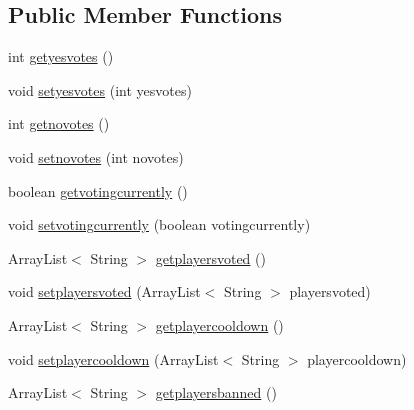 \subsection*{Public Member Functions}
\begin{DoxyCompactItemize}
\item 
int \hyperlink{classcom_1_1thenewprogramming_1_1_bukkit_1_1_vote4_temp_ban_1_1_vote4_temp_ban_aa2fe99fcd8a5bd2bf58662a49bf83fc2}{getyesvotes} ()
\item 
void \hyperlink{classcom_1_1thenewprogramming_1_1_bukkit_1_1_vote4_temp_ban_1_1_vote4_temp_ban_aa6ca06753febe9971e1d5eac46560e5f}{setyesvotes} (int yesvotes)
\item 
int \hyperlink{classcom_1_1thenewprogramming_1_1_bukkit_1_1_vote4_temp_ban_1_1_vote4_temp_ban_ab185c48a259ecf15e94bbfda3c22665e}{getnovotes} ()
\item 
void \hyperlink{classcom_1_1thenewprogramming_1_1_bukkit_1_1_vote4_temp_ban_1_1_vote4_temp_ban_a557bb10dc10906c35c2f3c40ee1343d7}{setnovotes} (int novotes)
\item 
boolean \hyperlink{classcom_1_1thenewprogramming_1_1_bukkit_1_1_vote4_temp_ban_1_1_vote4_temp_ban_a8f782830430b105dd0df19c17b91d0f3}{getvotingcurrently} ()
\item 
void \hyperlink{classcom_1_1thenewprogramming_1_1_bukkit_1_1_vote4_temp_ban_1_1_vote4_temp_ban_a4b8efbbf0fb52177f78c649d38e3be5a}{setvotingcurrently} (boolean votingcurrently)
\item 
Array\-List$<$ String $>$ \hyperlink{classcom_1_1thenewprogramming_1_1_bukkit_1_1_vote4_temp_ban_1_1_vote4_temp_ban_a335936e5cd6e45e17a625bf6c8a4a9a2}{getplayersvoted} ()
\item 
void \hyperlink{classcom_1_1thenewprogramming_1_1_bukkit_1_1_vote4_temp_ban_1_1_vote4_temp_ban_a8c3f2e4375e1eadce28e99d58e36dd58}{setplayersvoted} (Array\-List$<$ String $>$ playersvoted)
\item 
Array\-List$<$ String $>$ \hyperlink{classcom_1_1thenewprogramming_1_1_bukkit_1_1_vote4_temp_ban_1_1_vote4_temp_ban_ae0d37a73a2d093aed8efea23a3a4504d}{getplayercooldown} ()
\item 
void \hyperlink{classcom_1_1thenewprogramming_1_1_bukkit_1_1_vote4_temp_ban_1_1_vote4_temp_ban_a4765c64b4de826181facc3f773293c51}{setplayercooldown} (Array\-List$<$ String $>$ playercooldown)
\item 
Array\-List$<$ String $>$ \hyperlink{classcom_1_1thenewprogramming_1_1_bukkit_1_1_vote4_temp_ban_1_1_vote4_temp_ban_ac98ce29e07f2c102b34843d72df4ecf9}{getplayersbanned} ()

\end{DoxyCompactItemize}
